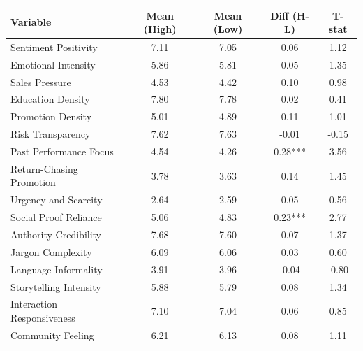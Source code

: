 \begin{table}[!ht]
\begin{tabular}{lcccc}
\toprule
Variable & Mean (High) & Mean (Low) & Diff (H-L) & T-stat \\ \midrule
Sentiment Positivity & 7.11 & 7.05 & 0.06 & 1.12 \\
Emotional Intensity & 5.86 & 5.81 & 0.05 & 1.35 \\
Sales Pressure & 4.53 & 4.42 & 0.10 & 0.98 \\
Education Density & 7.80 & 7.78 & 0.02 & 0.41 \\
Promotion Density & 5.01 & 4.89 & 0.11 & 1.01 \\
Risk Transparency & 7.62 & 7.63 & -0.01 & -0.15 \\
Past Performance Focus & 4.54 & 4.26 & 0.28*** & 3.56 \\
Return-Chasing Promotion & 3.78 & 3.63 & 0.14 & 1.45 \\
Urgency and Scarcity & 2.64 & 2.59 & 0.05 & 0.56 \\
Social Proof Reliance & 5.06 & 4.83 & 0.23*** & 2.77 \\
Authority Credibility & 7.68 & 7.60 & 0.07 & 1.37 \\
Jargon Complexity & 6.09 & 6.06 & 0.03 & 0.60 \\
Language Informality & 3.91 & 3.96 & -0.04 & -0.80 \\
Storytelling Intensity & 5.88 & 5.79 & 0.08 & 1.34 \\
Interaction Responsiveness & 7.10 & 7.04 & 0.06 & 0.85 \\
Community Feeling & 6.21 & 6.13 & 0.08 & 1.11 \\ \bottomrule
\end{tabular}

\end{table}